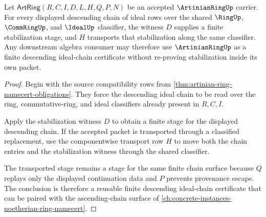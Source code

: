\begin{theorem}\label{thm:artinian-ring-descending-chain-stability}
Let $\mathsf{ArtRing}(R,C,I,D,L,H,Q,P,N)$ be an accepted $\ArtinianRingUp$ carrier. For every displayed descending chain of ideal rows over the shared $\RingUp$, $\CommRingUp$, and $\IdealUp$ classifier, the witness $D$ supplies a finite stabilization stage, and $H$ transports that stabilization along the same classifier. Any downstream algebra consumer may therefore use $\ArtinianRingUp$ as a finite descending ideal-chain certificate without re-proving stabilization inside its own packet.
\end{theorem}
\begin{proof}
Begin with the source compatibility rows from \autoref{thm:artinian-ring-namecert-obligations}. They force the descending ideal chain to be read over the ring, commutative-ring, and ideal classifiers already present in $R,C,I$.

Apply the stabilization witness $D$ to obtain a finite stage for the displayed descending chain. If the accepted packet is transported through a classified replacement, use the componentwise transport row $H$ to move both the chain entries and the stabilization witness through the shared classifier.

The transported stage remains a stage for the same finite chain surface because $Q$ replays only the displayed continuation data and $P$ prevents provenance escape. The conclusion is therefore a reusable finite descending ideal-chain certificate that can be paired with the ascending-chain surface of \autoref{ch:concrete-instances-noetherian-ring-namecert}.
\end{proof}


\begin{closurestatus}{\ArtinianRingUp}
  \theoryclosure{\seedClosure}
  \formalstatus{\unformalizedV}
\end{closurestatus}

